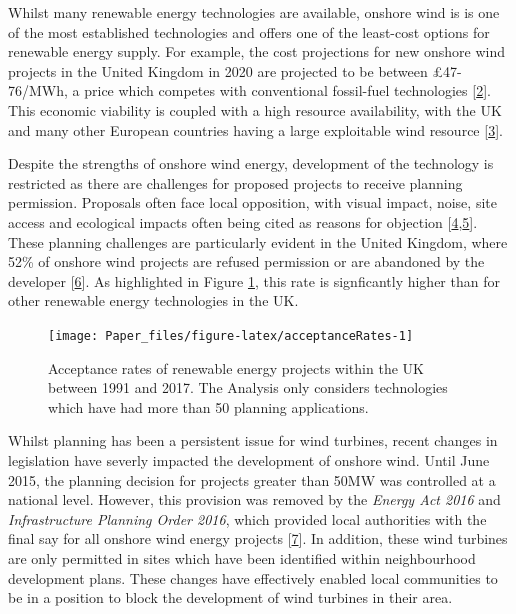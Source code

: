 \documentclass[a4paper,]{article}
\theoremstyle{definition}
\theoremstyle{definition}
\theoremstyle{definition}
\theoremstyle{remark}
\begin{document}
Whilst many renewable energy technologies are available, onshore wind is
is one of the most established technologies and offers one of the
least-cost options for renewable energy supply. For example, the cost
projections for new onshore wind projects in the United Kingdom in 2020
are projected to be between £47-76/MWh, a price which competes with
conventional fossil-fuel technologies
{[}\protect\hyperlink{ref-DBIES2016}{2}{]}. This economic viability is
coupled with a high resource availability, with the UK and many other
European countries having a large exploitable wind resource
{[}\protect\hyperlink{ref-EuropeanEnvironmentAgency2009}{3}{]}.

Despite the strengths of onshore wind energy, development of the
technology is restricted as there are challenges for proposed projects
to receive planning permission. Proposals often face local opposition,
with visual impact, noise, site access and ecological impacts often
being cited as reasons for objection
{[}\protect\hyperlink{ref-Wolsink2000}{4},\protect\hyperlink{ref-Langer2016}{5}{]}.
These planning challenges are particularly evident in the United
Kingdom, where 52\% of onshore wind projects are refused permission or
are abandoned by the developer
{[}\protect\hyperlink{ref-DECC2016}{6}{]}. As highlighted in Figure
\ref{fig:acceptanceRates}, this rate is signficantly higher than for
other renewable energy technologies in the UK.





\begin{figure}[h]

{\centering \texttt{[image: Paper\_files/figure-latex/acceptanceRates-1]} 

}

\caption{Acceptance rates of renewable energy projects
within the UK between 1991 and 2017. The Analysis only considers
technologies which have had more than 50 planning applications.}\label{fig:acceptanceRates}
\end{figure}

Whilst planning has been a persistent issue for wind turbines, recent
changes in legislation have severly impacted the development of onshore
wind. Until June 2015, the planning decision for projects greater than
50MW was controlled at a national level. However, this provision was
removed by the \emph{Energy Act 2016} and \emph{Infrastructure Planning
Order 2016}, which provided local authorities with the final say for all
onshore wind energy projects {[}\protect\hyperlink{ref-Smith2016}{7}{]}.
In addition, these wind turbines are only permitted in sites which have
been identified within neighbourhood development plans. These changes
have effectively enabled local communities to be in a position to block
the development of wind turbines in their area.
\end{document}
